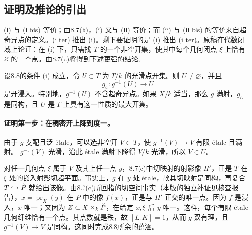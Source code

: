 \subsection*{证明及推论的引出}
(i) 与 (i bis) 等价；由8.7(b)，(i) 又与 (ii) 等价；而 (ii) 与 (ii bis) 的等价来自超奇异点的定义。(i ter) 推出 (i)。剩下要证明的是 (i) 推出 (i ter)。原稿在代数闭域上论证：在 (i) 下，只需找 $T$ 的一个非空开集，使其中每个几何闭点 $\xi$ 上恰有 $Z$ 的一个点。由8.7(c)将得到下述更强的结论。

设8.8的条件 (i) 成立，令 $U\subset T$ 为 $T/k$ 的光滑点开集。则 $U\ne\varnothing$，并且
\[
 g_U: g^{-1}(U)\longrightarrow U
\]
是开浸入。特别地，$g^{-1}(U)$ 不含超奇异点。如果 $X/k$ 适当，那么 $g$ 满射，$g_U$ 是同构，且 $U$ 是 $T$ 上具有这一性质的最大开集。

\paragraph{证明第一步：在稠密开上降到度一。}
由于 $g$ 支配且泛 étale，可以选非空开 $V\subset T$，使 $g^{-1}(V)\to V$ 有限 étale 且满射。 $g^{-1}(V)$ 光滑，沿此 étale 满射下降得 $V/k$ 光滑，所以 $V\subset U$。


对任一几何点 $\xi$ 属于 $V$ 及其上任一点 $y$，8.7(c)中切映射的射影像 $H'$，正是 $T$ 在 $\xi$ 处的嵌入射影切超平面。事实上，$g$ 在 $y$ 处 étale，故其切映射是同构，再复合 $T\hookrightarrow\check P$ 就给出该像。由8.7(c)所回指的切空间事实（本版的独立补证见核查报告），$x=\operatorname{pr}_X(y)$ 在 $P$ 中的像 $f(x)$，正是与 $H'$ 正交的唯一点。因为 $f$ 是浸入，$x$ 唯一；又因为 $Z\subset X\times_k\check P$，在给定 $x,\xi$ 后 $y$ 唯一。这样，每个有限 étale 几何纤维恰有一个点。其点数就是秩，故 $[L:K]=1$，从而 $g$ 双有理，且 $g^{-1}(V)\to V$ 是同构。这同时完成8.8所余的蕴涵。

